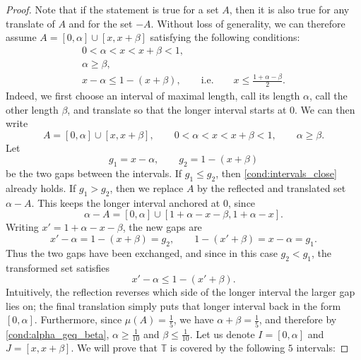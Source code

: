 \documentclass{article}
\begin{document}
\begin{proof}
        Note that if the statement is true for a set $A$, then it is also true for any translate of $A$ and for the set $-A$.
        Without loss of generality, we can therefore assume 
        $A = [0, \alpha] \cup [x, x + \beta]$ satisfying the following conditions:
            \begin{align}
            0 < \alpha < x < x + \beta < 1, \label{cond:intervals_order} \\
            \alpha \geq \beta, \label{cond:alpha_geq_beta} \\
            x - \alpha \leq 1 - (x + \beta), \qquad\text{i.e.}\qquad x \leq \frac{1 + \alpha - \beta}{2}. \label{cond:intervals_close}
        \end{align}
        Indeed, we first choose an interval of maximal length, call its length $\alpha$, call the other length $\beta$, and translate so that the longer interval starts at $0$.
        We can then write
        \[
            A = [0, \alpha] \cup [x, x + \beta],
            \qquad 0 < \alpha < x < x + \beta < 1,
            \qquad \alpha \geq \beta.
        \]
        Let
        \[
            g_1 = x - \alpha,
            \qquad
            g_2 = 1 - (x + \beta)
        \]
        be the two gaps between the intervals.
        If $g_1 \leq g_2$, then \eqref{cond:intervals_close} already holds.
        If $g_1 > g_2$, then we replace $A$ by the reflected and translated set $\alpha - A$.
        This keeps the longer interval anchored at $0$, since
        \[
            \alpha - A
            =
            [0,\alpha] \cup [1 + \alpha - x - \beta, 1 + \alpha - x].
        \]
        Writing $x' = 1 + \alpha - x - \beta$, the new gaps are
        \[
            x' - \alpha = 1 - (x + \beta) = g_2,
            \qquad
            1 - (x' + \beta) = x - \alpha = g_1.
        \]
        Thus the two gaps have been exchanged, and since in this case $g_2 < g_1$, the transformed set satisfies
        \[
            x' - \alpha \leq 1 - (x' + \beta).
        \]
        Intuitively, the reflection reverses which side of the longer interval the larger gap lies on;
        the final translation simply puts that longer interval back in the form $[0,\alpha]$.
        Furthermore, since $\mu(A)=\frac{1}{5}$, we have $\alpha + \beta = \frac{1}{5}$, 
        and therefore by \eqref{cond:alpha_geq_beta}, $\alpha \geq \frac{1}{10}$ and $\beta \leq \frac{1}{10}$.
        Let us denote $I = [0, \alpha]$ and $J = [x, x + \beta]$. 
        We will prove that $\mathbb{T}$ is covered by the following $5$ intervals:


\end{proof}
\end{document}
